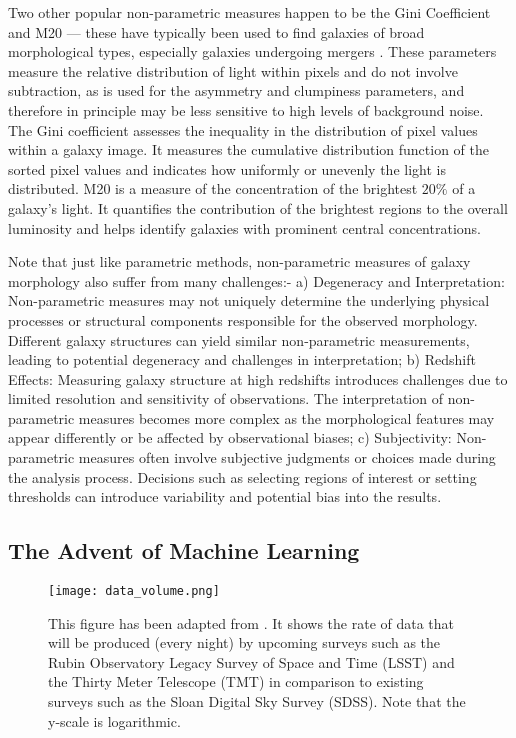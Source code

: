 Two other popular non-parametric measures happen to be the Gini Coefficient and M20 --- these have typically been used to find galaxies of broad morphological types, especially galaxies undergoing mergers \citep{abraham_03, lotz_04}. These parameters measure the relative distribution of light within pixels and do not involve subtraction, as is used for the asymmetry and clumpiness parameters, and therefore in principle may be less sensitive to high levels of background noise. The Gini coefficient assesses the inequality in the distribution of pixel values within a galaxy image. It measures the cumulative distribution function of the sorted pixel values and indicates how uniformly or unevenly the light is distributed. M20 is a measure of the concentration of the brightest $20\%$ of a galaxy's light. It quantifies the contribution of the brightest regions to the overall luminosity and helps identify galaxies with prominent central concentrations.

Note that just like parametric methods, non-parametric measures of galaxy morphology also suffer from many challenges:- a) Degeneracy and Interpretation: Non-parametric measures may not uniquely determine the underlying physical processes or structural components responsible for the observed morphology. Different galaxy structures can yield similar non-parametric measurements, leading to potential degeneracy and challenges in interpretation; b) Redshift Effects: Measuring galaxy structure at high redshifts introduces challenges due to limited resolution and sensitivity of observations. The interpretation of non-parametric measures becomes more complex as the morphological features may appear differently or be affected by observational biases; c) Subjectivity:  Non-parametric measures often involve subjective judgments or choices made during the analysis process. Decisions such as selecting regions of interest or setting thresholds can introduce variability and potential bias into the results.

\subsection{The Advent of Machine Learning} \label{sec_intro:ml_morph}

\begin{figure}[htbp]
    \centering
    \texttt{[image: data\_volume.png]}
    \caption{This figure has been adapted from \citet{kremer_17}. It shows the rate of data that will be produced (every night) by upcoming surveys such as the Rubin Observatory Legacy Survey of Space and Time (LSST) and the Thirty Meter Telescope (TMT) in comparison to existing surveys such as the Sloan Digital Sky Survey (SDSS). Note that the y-scale is logarithmic.}
    \label{fig_intro:data_volume}
\end{figure}


